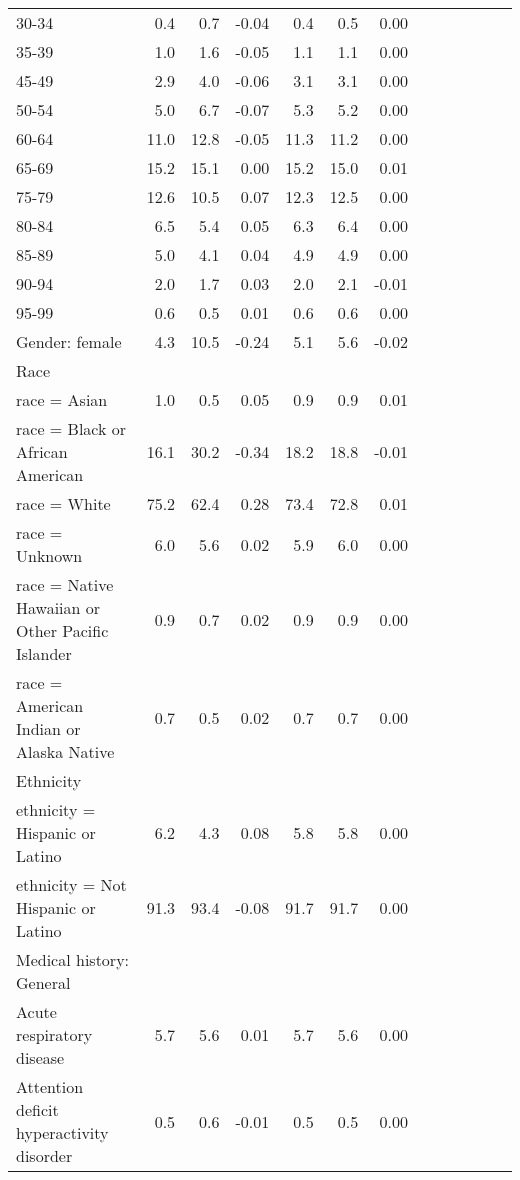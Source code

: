 \documentclass[11pt,]{article}
\begin{document}
\begin{longtable}{lrrrrrrrrrrrr}
      30-34 &  0.4 &  0.7 & -0.04 &  0.4 &  0.5 &  0.00 \\ 
      35-39 &  1.0 &  1.6 & -0.05 &  1.1 &  1.1 &  0.00 \\ 
      45-49 &  2.9 &  4.0 & -0.06 &  3.1 &  3.1 &  0.00 \\ 
      50-54 &  5.0 &  6.7 & -0.07 &  5.3 &  5.2 &  0.00 \\ 
      60-64 & 11.0 & 12.8 & -0.05 & 11.3 & 11.2 &  0.00 \\ 
      65-69 & 15.2 & 15.1 &  0.00 & 15.2 & 15.0 &  0.01 \\ 
      75-79 & 12.6 & 10.5 &  0.07 & 12.3 & 12.5 &  0.00 \\ 
      80-84 &  6.5 &  5.4 &  0.05 &  6.3 &  6.4 &  0.00 \\ 
      85-89 &  5.0 &  4.1 &  0.04 &  4.9 &  4.9 &  0.00 \\ 
      90-94 &  2.0 &  1.7 &  0.03 &  2.0 &  2.1 & -0.01 \\ 
      95-99 &  0.6 &  0.5 &  0.01 &  0.6 &  0.6 &  0.00 \\ 
  Gender: female &  4.3 & 10.5 & -0.24 &  5.1 &  5.6 & -0.02 \\ 
  Race &    &    &     &    &    &     \\ 
      race = Asian &  1.0 &  0.5 &  0.05 &  0.9 &  0.9 &  0.01 \\ 
      race = Black or African American & 16.1 & 30.2 & -0.34 & 18.2 & 18.8 & -0.01 \\ 
      race = White & 75.2 & 62.4 &  0.28 & 73.4 & 72.8 &  0.01 \\ 
      race = Unknown &  6.0 &  5.6 &  0.02 &  5.9 &  6.0 &  0.00 \\ 
      race = Native Hawaiian or Other Pacific Islander &  0.9 &  0.7 &  0.02 &  0.9 &  0.9 &  0.00 \\ 
      race = American Indian or Alaska Native &  0.7 &  0.5 &  0.02 &  0.7 &  0.7 &  0.00 \\ 
  Ethnicity &    &    &     &    &    &     \\ 
      ethnicity = Hispanic or Latino &  6.2 &  4.3 &  0.08 &  5.8 &  5.8 &  0.00 \\ 
      ethnicity = Not Hispanic or Latino & 91.3 & 93.4 & -0.08 & 91.7 & 91.7 &  0.00 \\ 
  Medical history: General &    &    &     &    &    &     \\ 
      Acute respiratory disease &  5.7 &  5.6 &  0.01 &  5.7 &  5.6 &  0.00 \\ 
      Attention deficit hyperactivity disorder &  0.5 &  0.6 & -0.01 &  0.5 &  0.5 &  0.00 \\ 

\end{longtable}
\end{document}
